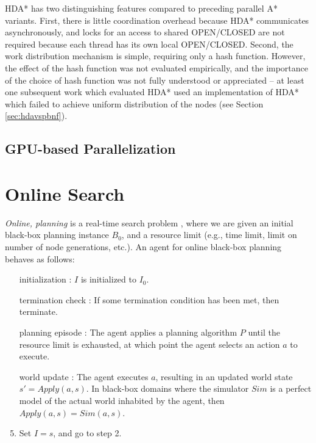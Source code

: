 \documentclass{report}
\begin{document}
HDA* has two distinguishing features compared to preceding parallel A* variants.
First, there is little coordination overhead because HDA* communicates asynchronously, and %
locks for an access to shared OPEN/CLOSED are not required because each thread has its own local OPEN/CLOSED.
Second, the work distribution mechanism is simple, requiring only a hash function.
However, the effect of the hash function was not evaluated empirically, and the importance of the choice of hash function was not fully understood or appreciated --
at least one subsequent work which evaluated HDA* used an implementation of HDA* which failed to achieve uniform distribution of the nodes (see Section \ref{sec:hdavspbnf}).%

\subsection{GPU-based Parallelization}


\section{Online Search}
\emph{Online, planning}  is a  real-time search  problem \cite{Korf90}, where we are given an initial black-box planning instance $B_0$, and a resource limit (e.g., time limit, limit on number of node generations, etc.).
An agent for online black-box planning behaves as follows:
\begin{enumerate}
\item [initialization]: $I$ is initialized to $I_0$.
\item [termination check]: If some termination condition has been met, then terminate.
\item [planning episode]: The agent applies a planning algorithm $P$ until the resource limit is exhausted, at which point the agent selects an action $a$ to execute.
\item [world update]: The agent executes $a$, resulting in an updated world state $s' = Apply(a,s)$. In black-box domains where the simulator $Sim$ is a perfect model of  the actual world inhabited by the agent, then $Apply(a,s) = Sim(a,s)$. 
\item Set $I= s$, and go to step 2.
\end{enumerate}
\end{document}
